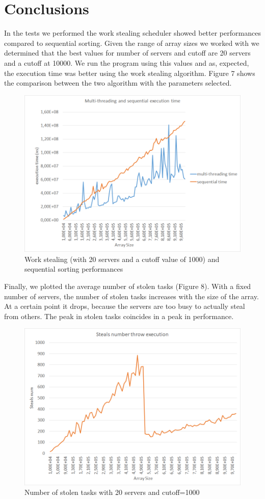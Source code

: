 \documentclass{article}
\begin{document}
\clearpage

\section{Conclusions}
	In the tests we performed the work stealing scheduler showed better performances compared to sequential sorting.
	Given the range of array sizes we worked with we determined that the best values for number of servers and cutoff are 20 servers and a cutoff at 10000. 
	We run the program using this values and as, expected, the execution time was better using the work stealing algorithm.
	Figure 7 shows the comparison between the two algorithm with the parameters selected.	
			
	\begin{figure}[!h]
		\centering
		\includegraphics[width=0.8\linewidth]{imgs/seqVSmultithreading.png}
		\caption{Work stealing (with 20 servers and a cutoff value of 1000) and sequential sorting performances}				
		\label{fig:program}
	\end{figure}

	Finally, we plotted the average number of stolen tasks (Figure 8). With a fixed number of servers, the number of stolen tasks increases with the size of the array. At a certain point it drops, because the servers are too busy to actually steal from others. The peak in stolen tasks coincides in a peak in performance.
	
	\begin{figure}[!h]
		\centering
	\includegraphics[width=0.8\linewidth]{imgs/stealsNum20servers1000cutoff.png}
		\caption{Number of stolen tasks with 20 servers and cutoff=1000}
		\label{fig:starve}
	\end{figure}
\end{document}
